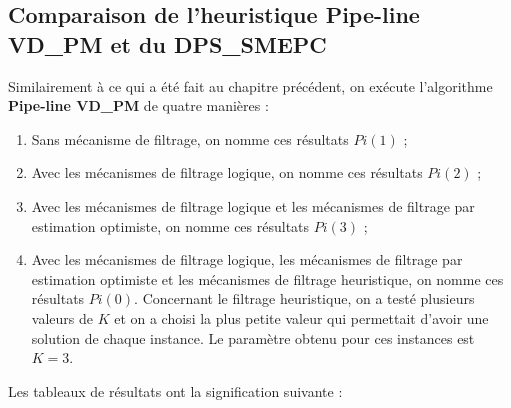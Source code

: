 \subsection{Comparaison de l'heuristique Pipe-line VD\_PM et du DPS\_SMEPC}
Similairement à ce qui a été fait au chapitre précédent, on exécute l'algorithme \textbf{Pipe-line VD\_PM} de quatre manières : 
\begin{enumerate}
	
	\item Sans mécanisme de filtrage, on nomme ces résultats $Pi(1)$ ;
	\item Avec les mécanismes de filtrage logique, on nomme ces résultats $Pi(2)$ ;
	\item Avec les mécanismes de filtrage logique et les mécanismes de filtrage par estimation optimiste, on nomme ces résultats $Pi(3)$ ;
	\item Avec les mécanismes de filtrage logique, les mécanismes de filtrage par estimation optimiste et  les mécanismes de filtrage heuristique, on nomme ces résultats $Pi(0)$. Concernant le filtrage heuristique, on a testé plusieurs valeurs de $K$ et on a choisi la plus petite valeur qui permettait d'avoir une solution de chaque instance. Le paramètre obtenu pour ces instances est $K=3$.
	
\end{enumerate}
Les tableaux de résultats ont la signification suivante :

